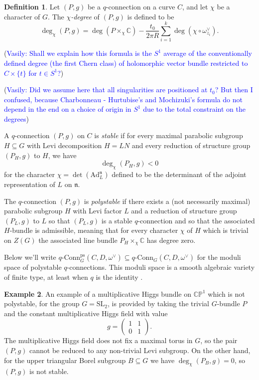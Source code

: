\documentclass[11pt, oneside, reqno]{amsart}
\theoremstyle{definition} \newtheorem{definition}{Definition}[section]
\theoremstyle{definition} \newtheorem{remark}[definition]{Remark}
\theoremstyle{definition} \newtheorem{remarks}[definition]{Remarks}
\theoremstyle{definition} \newtheorem{question}[definition]{Question}
\theoremstyle{definition} \newtheorem*{note}{Note}
\theoremstyle{definition} \newtheorem{example}[definition]{Example}
\theoremstyle{definition} \newtheorem{examples}[definition]{Examples}
\newcommand{\bb}[1]{\mathbb{#1}}
\newcommand{\mr}[1]{\mathrm{#1}}
\newcommand{\mf}[1]{\mathfrak{#1}}
\newcommand{\CC}{\mathbb{C}}
\newcommand{\SL}{\mathrm{SL}}
\newcommand{\sub}{\subseteq}
\newcommand{\qconn}{q\text{-Conn}}
\newcommand{\vasily}[1]{(\textcolor{blue}{Vasily: #1})}
\begin{document}
\begin{definition} \label{polystable_def}
Let $(P,g)$ be a $q$-connection on a curve $C$, and let $\chi$ be a character of $G$.  The \emph{$\chi$-degree} of $(P,g)$ is defined to be 
\[\deg_\chi(P,g) = \deg(P \times_\chi \CC) - \frac {t_0}{2\pi R} \sum_{i=1}^k \deg(\chi \circ \omega^\vee_{z_i}).\]

\vasily{Shall we explain how this formula is the $S^1$ average of the
  conventionally defined degree (the first Chern class) of
  holomorphic vector bundle restricted to $C \times \{t\}$ for $t \in S^1$?}

\vasily{Did we assume here that all singularities are positioned at $t_0$?
  But then I confused, because Charbonneau - Hurtubise's and Mochizuki's
  formula do not depend in the end on a choice of origin in $S^1$ due
 to the total constraint on the degrees}

A $q$-connection $(P,g)$ on $C$ is \emph{stable} if for every maximal parabolic subgroup $H \sub G$ with Levi decomposition $H = LN$ and every reduction of structure group $(P_H, g)$ to $H$, we have
\[\deg_\chi(P_H, g) < 0\]
for the character $\chi = \det(\mr{Ad}_L^{\mf n})$ defined to be the determinant of the adjoint representation of $L$ on $\mf n$.

The $q$-connection $(P,g)$ is \emph{polystable} if there exists a (not necessarily maximal) parabolic subgroup $H$ with Levi factor $L$ and a reduction of structure group $(P_L, g)$ to $L$ so that $(P_L,g)$ is a stable $q$-connection and so that the associated $H$-bundle is admissible, meaning that for every character $\chi$ of $H$ which is trivial on $Z(G)$ the associated line bundle $P_H \times_\chi \CC$ has degree zero. 
\end{definition}

Below we'll write $\qconn_G^{\text{ps}}(C, D, \omega^\vee) \sub \qconn_G(C,D,\omega^\vee)$ for the moduli space of polystable $q$-connections.  This moduli space is a smooth algebraic variety of finite type, at least when $q$ is the identity \cite{CharbonneauHurtubise,Smith}.  

\begin{example}
An example of a multiplicative Higgs bundle on $\bb{CP}^1$ which is not polystable, for the group $G = \SL_2$, is provided by taking the trivial $G$-bundle $P$ and the constant multiplicative Higgs field with value \[g = \begin{pmatrix}1&1\\0&1\end{pmatrix}.\]  The multiplicative Higgs field does not fix a maximal torus in $G$, so the pair $(P,g)$ cannot be reduced to any non-trivial Levi subgroup.  On the other hand, for the upper triangular Borel subgroup $B \sub G$ we have $\deg_\chi(P_B, g) = 0$, so $(P,g)$ is not stable.
\end{example}
\end{document}
